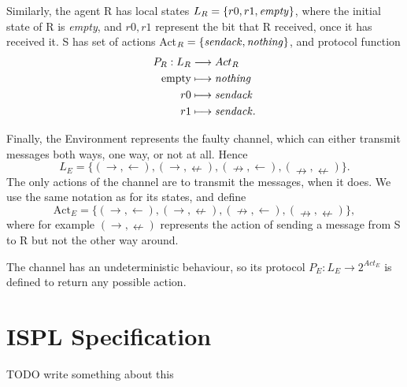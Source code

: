 \documentclass[11pt]{report}
\begin{document}
Similarly, the agent R has local states $L_R = \{r0, r1, \mbox{\textit{empty}}\}$, where the initial state of R is \textit{empty}, and $r0, r1$ represent the bit that R received, once it has received it. S has set of actions Act$_R = \{\mbox{\textit{sendack}}, \mbox{\textit{nothing}}\}$, and protocol function 
\begin{align*}
P_R: L_R &\longrightarrow Act_R \\
     \mbox{empty} &\longmapsto \mbox{\textit{nothing}} \\
	 r0 &\longmapsto \mbox{\textit{sendack}} \\
	 r1 &\longmapsto \mbox{\textit{sendack}}.
\end{align*}

Finally, the Environment represents the faulty channel, which can either transmit messages both ways, one way, or not at all. Hence $$L_E = \{(\rightarrow, \leftarrow), (\rightarrow, \nleftarrow), (\nrightarrow, \leftarrow), (\nrightarrow, \nleftarrow)\}.$$
The only actions of the channel are to transmit the messages, when it does. We use the same notation as for its states, and define $$\mbox{Act}_E = \{(\rightarrow, \leftarrow), (\rightarrow, \nleftarrow), (\nrightarrow, \leftarrow), (\nrightarrow, \nleftarrow)\}, $$ where for example $(\rightarrow, \nleftarrow)$ represents the action of sending a message from S to R but not the other way around.

The channel has an undeterministic behaviour, so its protocol $P_E: L_E \longrightarrow 2^{Act_E}$ is defined to return any possible action. 

\section{ISPL Specification}

TODO write something about this
\end{document}
